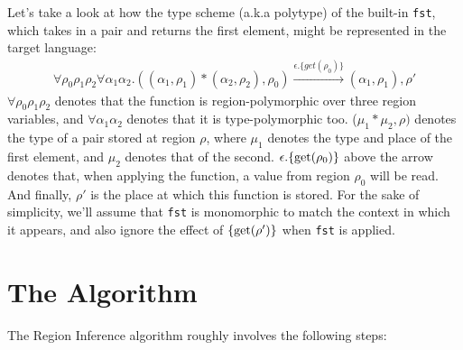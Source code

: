 \documentclass[11pt]{report}
\begin{document}
Let's take a look at how the type scheme (a.k.a polytype) of the built-in \texttt{fst}, which takes in a pair and returns the first element, might be represented in the target language:
\begin{align*}
\forall \rho_0 \rho_1 \rho_2 \forall \alpha_1 \alpha_2. ((\alpha_1, \rho_1) * (\alpha_2, \rho_2), \rho_0) \xrightarrow{\epsilon.\{get(\rho_0)\}} (\alpha_1, \rho_1), \rho'
\end{align*}
$\forall \rho_0 \rho_1 \rho_2$ denotes that the function is region-polymorphic over three region variables, and $\forall \alpha_1 \alpha_2$ denotes that it is type-polymorphic too. ($\mu_1 * \mu_2, \rho)$ denotes the type of a pair stored at region $\rho$, where $\mu_1$ denotes the type and place of the first element, and $\mu_2$ denotes that of the second. $\rm \epsilon.\{get(\rho_0)\}$ above the arrow denotes that, when applying the function, a value from region $\rho_0$ will be read. And finally, $\rho'$ is the place at which this function is stored. For the sake of simplicity, we'll assume that \texttt{fst} is monomorphic to match the context in which it appears, and also ignore the effect of $\rm \{get(\rho')\}$ when \texttt{fst} is applied.

\newpage

\section*{The Algorithm}

The Region Inference algorithm roughly involves the following steps:
\end{document}
